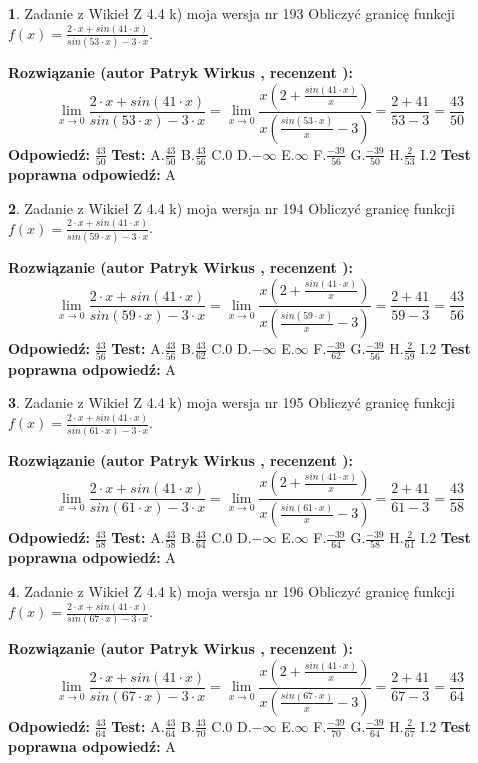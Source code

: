 \documentclass[12pt, a4paper]{article}
\theoremstyle{definition} %
\newtheorem{zad}{}
\newcommand{\zadStart}[1]{\begin{zad}#1\newline}
\newcommand{\zadStop}{\end{zad}}
\newcommand{\rozwStart}[2]{\noindent \textbf{Rozwiązanie (autor #1 , recenzent #2): }\newline}
\newcommand{\rozwStop}{\newline}
\newcommand{\odpStart}{\noindent \textbf{Odpowiedź:}\newline}
\newcommand{\odpStop}{\newline}
\newcommand{\testStart}{\noindent \textbf{Test:}\newline}
\newcommand{\testStop}{\newline}
\newcommand{\kluczStart}{\noindent \textbf{Test poprawna odpowiedź:}\newline}
\newcommand{\kluczStop}{\newline}
\begin{document}
\zadStart{Zadanie z Wikieł Z 4.4 k) moja wersja nr 193}
Obliczyć granicę funkcji $f(x)=\frac{2\cdot x +sin(41\cdot x)}{sin(53\cdot x) -3\cdot x}$.
\zadStop
\rozwStart{Patryk Wirkus}{}
$$\lim\limits_{x\to 0}\frac{2\cdot x +sin(41\cdot x)}{sin(53\cdot x) -3\cdot x}
=\lim\limits_{x\to 0}\frac{x(2+\frac{sin(41\cdot x)}{x})}{x(\frac{sin(53\cdot x)}{x}-3)}
=\frac{2+41}{53-3} = \frac{43}{50}$$
\rozwStop
\odpStart
$\frac{43}{50}$
\odpStop
\testStart
A.$\frac{43}{50}$
B.$\frac{43}{56}$
C.$0$
D.$-\infty$
E.$\infty$
F.$\frac{-39}{56}$
G.$\frac{-39}{50}$
H.$\frac{2}{53}$
I.$2$
\testStop
\kluczStart
A
\kluczStop



\zadStart{Zadanie z Wikieł Z 4.4 k) moja wersja nr 194}
Obliczyć granicę funkcji $f(x)=\frac{2\cdot x +sin(41\cdot x)}{sin(59\cdot x) -3\cdot x}$.
\zadStop
\rozwStart{Patryk Wirkus}{}
$$\lim\limits_{x\to 0}\frac{2\cdot x +sin(41\cdot x)}{sin(59\cdot x) -3\cdot x}
=\lim\limits_{x\to 0}\frac{x(2+\frac{sin(41\cdot x)}{x})}{x(\frac{sin(59\cdot x)}{x}-3)}
=\frac{2+41}{59-3} = \frac{43}{56}$$
\rozwStop
\odpStart
$\frac{43}{56}$
\odpStop
\testStart
A.$\frac{43}{56}$
B.$\frac{43}{62}$
C.$0$
D.$-\infty$
E.$\infty$
F.$\frac{-39}{62}$
G.$\frac{-39}{56}$
H.$\frac{2}{59}$
I.$2$
\testStop
\kluczStart
A
\kluczStop



\zadStart{Zadanie z Wikieł Z 4.4 k) moja wersja nr 195}
Obliczyć granicę funkcji $f(x)=\frac{2\cdot x +sin(41\cdot x)}{sin(61\cdot x) -3\cdot x}$.
\zadStop
\rozwStart{Patryk Wirkus}{}
$$\lim\limits_{x\to 0}\frac{2\cdot x +sin(41\cdot x)}{sin(61\cdot x) -3\cdot x}
=\lim\limits_{x\to 0}\frac{x(2+\frac{sin(41\cdot x)}{x})}{x(\frac{sin(61\cdot x)}{x}-3)}
=\frac{2+41}{61-3} = \frac{43}{58}$$
\rozwStop
\odpStart
$\frac{43}{58}$
\odpStop
\testStart
A.$\frac{43}{58}$
B.$\frac{43}{64}$
C.$0$
D.$-\infty$
E.$\infty$
F.$\frac{-39}{64}$
G.$\frac{-39}{58}$
H.$\frac{2}{61}$
I.$2$
\testStop
\kluczStart
A
\kluczStop



\zadStart{Zadanie z Wikieł Z 4.4 k) moja wersja nr 196}
Obliczyć granicę funkcji $f(x)=\frac{2\cdot x +sin(41\cdot x)}{sin(67\cdot x) -3\cdot x}$.
\zadStop
\rozwStart{Patryk Wirkus}{}
$$\lim\limits_{x\to 0}\frac{2\cdot x +sin(41\cdot x)}{sin(67\cdot x) -3\cdot x}
=\lim\limits_{x\to 0}\frac{x(2+\frac{sin(41\cdot x)}{x})}{x(\frac{sin(67\cdot x)}{x}-3)}
=\frac{2+41}{67-3} = \frac{43}{64}$$
\rozwStop
\odpStart
$\frac{43}{64}$
\odpStop
\testStart
A.$\frac{43}{64}$
B.$\frac{43}{70}$
C.$0$
D.$-\infty$
E.$\infty$
F.$\frac{-39}{70}$
G.$\frac{-39}{64}$
H.$\frac{2}{67}$
I.$2$
\testStop
\kluczStart
A
\kluczStop
\end{document}
